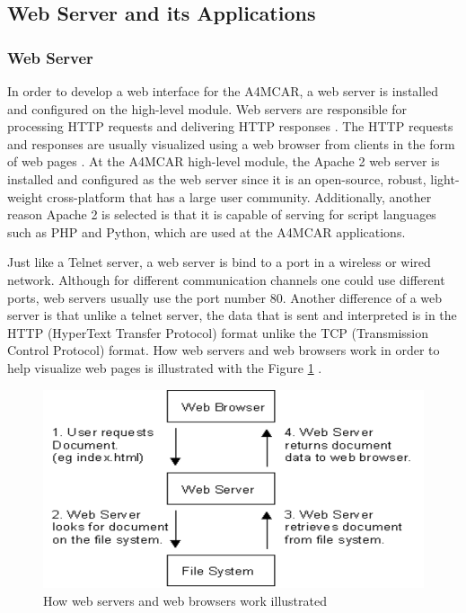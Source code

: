 \subsection{Web Server and its Applications}
\subsubsection{Web Server}
In order to develop a web interface for the A4MCAR, a web server is installed and configured on the high-level module. Web servers are responsible for processing HTTP requests and delivering HTTP responses \cite{apacheguide}. The HTTP requests and responses are usually visualized using a web browser from clients in the form of web pages \cite{apacheguide}. At the A4MCAR high-level module, the Apache 2 web server is installed and configured as the web server since it is an open-source, robust, light-weight cross-platform that has a large user community. Additionally, another reason Apache 2 is selected is that it is capable of serving for script languages such as PHP and Python, which are used at the A4MCAR applications.

Just like a Telnet server, a web server is bind to a port in a wireless or wired network. Although for different communication channels one could use different ports, web servers usually use the port number 80. Another difference of a web server is that unlike a telnet server, the data that is sent and interpreted is in the HTTP (HyperText Transfer Protocol) \cite{webserver} format unlike the TCP (Transmission Control Protocol) format. How web servers and web browsers work in order to help visualize web pages is illustrated with the Figure \ref{fig:webserver} \cite{webserver}. \\

\begin{figure}[!ht]
	\centering
	\captionsetup{justification=centering}
	\includegraphics[scale=0.5]{content/images/webserver.png}
	\caption{How web servers and web browsers work illustrated \cite{webserver}}
	\label{fig:webserver}
\end{figure}

